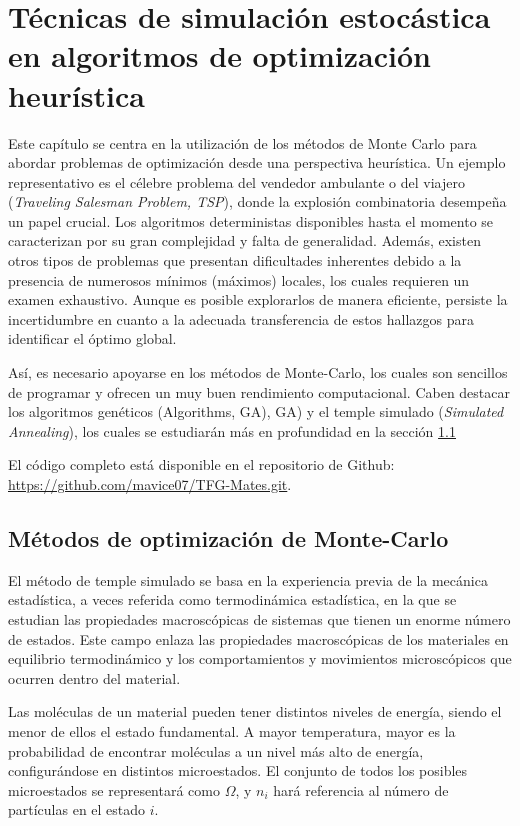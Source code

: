 \chapter{Técnicas de simulación estocástica en algoritmos de optimización heurística} \label{Capitulo 4}
Este capítulo se centra en la utilización de los métodos de Monte Carlo para abordar problemas de optimización desde una perspectiva heurística. Un ejemplo representativo es el célebre problema del vendedor ambulante o del viajero (\textit{Traveling Salesman Problem, TSP}), donde la explosión combinatoria desempeña un papel crucial. Los algoritmos deterministas disponibles hasta el momento se caracterizan por su gran complejidad y falta de generalidad. Además, existen otros tipos de problemas que presentan dificultades inherentes debido a la presencia de numerosos mínimos (máximos) locales, los cuales requieren un examen exhaustivo. Aunque es posible explorarlos de manera eficiente, persiste la incertidumbre en cuanto a la adecuada transferencia de estos hallazgos para identificar el óptimo global.

Así, es necesario apoyarse en los métodos de Monte-Carlo, los cuales son sencillos de programar y ofrecen un muy buen rendimiento computacional. Caben destacar los algoritmos genéticos (\textitGenetic Algorithms, GA{), GA}) y el temple simulado (\textit{Simulated Annealing}), los cuales se estudiarán más en profundidad en la sección \ref{sec:opt MC}

El código completo está disponible en el repositorio de Github: \url{https://github.com/mavice07/TFG-Mates.git}.

\section{Métodos de optimización de Monte-Carlo}\label{sec:opt MC}
El método de temple simulado se basa en la experiencia previa de la mecánica estadística, a veces referida como termodinámica estadística, en la que se estudian las propiedades macroscópicas de sistemas que tienen un enorme número de estados. Este campo enlaza las propiedades macroscópicas de los materiales en equilibrio termodinámico y los comportamientos y movimientos microscópicos que ocurren dentro del material.

Las moléculas de un material pueden tener distintos niveles de energía, siendo el menor de ellos el estado fundamental. A mayor temperatura, mayor es la probabilidad de encontrar moléculas a un nivel más alto de energía, configurándose en distintos microestados. El conjunto de todos los posibles microestados se representará como $\varOmega$, y $n_i$ hará referencia al número de partículas en el estado $i$.

